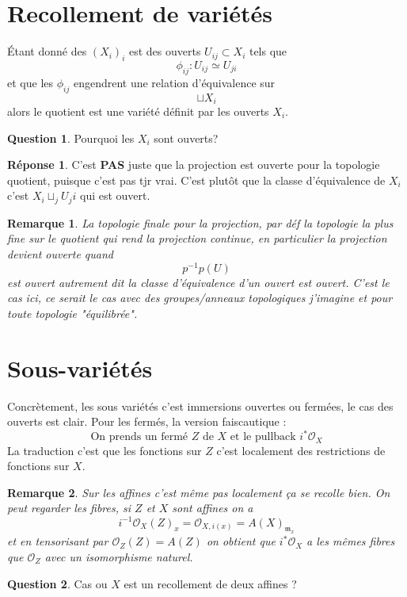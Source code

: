 \documentclass[a4paper,12pt]{book}
\newcommand{\Or}{\mathcal{O}}
\newcommand{\m}{\mathfrak{m}}
\theoremstyle{plain}
\newtheorem{rem}{Remarque}
\theoremstyle{definition}
\newtheorem{quest}{Question}
\newtheorem{rep}{Réponse}
\theoremstyle{remark}
\begin{document}
\section{Recollement de variétés}
Étant donné des $(X_i)_i$ est des ouverts $U_{ij}\subset X_i$ tels que
\[\phi_{ij}\colon U_{ij}\simeq U_{ji}\]
et que les $\phi_{ij}$ engendrent une relation d'équivalence sur 
\[\sqcup X_i\]
alors le quotient est une variété définit par les ouverts $X_i$.
\begin{quest}
    Pourquoi les $X_i$ sont ouverts?
\end{quest}

\begin{rep}
    C'est \textbf{PAS} juste que la projection est ouverte pour la
    topologie quotient, puisque c'est pas tjr vrai. C'est plutôt que
    la classe d'équivalence de $X_i$ c'est $X_i \sqcup_j U_ji$ qui est
    ouvert.
\end{rep}
\begin{rem}
    La topologie finale pour la projection, par déf
    la topologie la plus fine sur le quotient qui rend la projection
    continue, en particulier la projection devient ouverte quand
    \[p^{-1}p(U)\]
    est ouvert autrement dit la classe d'équivalence d'un ouvert
    est ouvert. C'est le cas ici, ce serait le cas avec des 
    groupes/anneaux topologiques j'imagine et pour toute topologie
    "équilibrée".
\end{rem}
\section{Sous-variétés}
Concrètement, les sous variétés c'est immersions ouvertes ou fermées,
le cas des ouverts est clair. Pour les fermés, la version faiscautique :
\[\textrm{On prends un fermé $Z$ de $X$ et le pullback }i^*\Or_X\]
La traduction c'est que les fonctions sur $Z$ c'est localement des
restrictions de fonctions sur $X$.
\begin{rem}
    Sur les affines c'est même pas localement ça se recolle bien.
    On peut regarder les fibres, si $Z$ et $X$ sont affines on a 
    \[i^{-1}\Or_X(Z)_x=\Or_{X,i(x)}=A(X)_{\m_x}\]
    et en tensorisant par $\Or_Z(Z)=A(Z)$ on obtient que $i^*\Or_X$
    a les mêmes fibres que $\Or_Z$ avec un isomorphisme naturel.
\end{rem}
\begin{quest}
    Cas ou $X$ est un recollement de deux affines ?
\end{quest}
\end{document}
